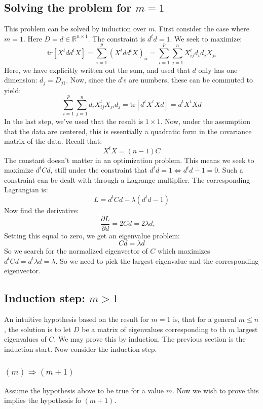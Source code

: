 \documentclass[12pt, a4paper]{article}
\numberwithin{equation}{section}
\begin{document}
\subsection{Solving the problem for $m=1$}
This problem can be solved by induction over $m$. First consider the case where $m=1$. Here $D=d\in\mathbb{R}^{n\times 1}$. The constraint is $d^t d=1$. We seek to maximize:
\begin{equation}
\textrm{tr}[X^t dd^t X]=\sum_{i=1}^p(X^t dd^t X)_{ii}=\sum_{i=1}^p\sum_{j=1}^n X^t_{ij}d_i d_j X_{ji}
\end{equation}
Here, we have explicitly written out the sum, and used that $d$ only has one dimension: $d_j=D_{j1}$. Now, since the $d$'s are numbers, these can be commuted to yield:
\begin{equation}
\sum_{i=1}^p\sum_{j=1}^n d_i X^t_{ij} X_{ji} d_j=\textrm{tr}[d^t X^t Xd]=d^t X^t Xd
\end{equation}
In the last step, we've used that the result is $1\times 1$. Now, under the assumption that the data are centered, this is essentially a quadratic form in the covariance matrix of the data. Recall that:
\begin{equation}
X^t X=(n-1)C
\end{equation}
The constant doesn't matter in an optimization problem. This means we seek to maximize $d^t Cd$, still under the constraint that $d^t d=1\Leftrightarrow d^t d-1=0$. Such a constraint can be dealt with through a Lagrange multiplier. The corresponding Lagrangian is:
\begin{equation}
L=d^t Cd-\lambda(d^t d-1)
\end{equation}
Now find the derivative:
\begin{equation}
\frac{\partial L}{\partial d}=2Cd=2\lambda d,\quad
\end{equation}
Setting this equal to zero, we get an eigenvalue problem:
\begin{equation}
Cd=\lambda d
\end{equation}
So we search for the normalized eigenvector of $C$ which maximizes $d^t Cd=d^t\lambda d=\lambda$. So we need to pick the largest eigenvalue and the corresponding eigenvector.

\subsection{Induction step: $m>1$}
An intuitive hypothesis based on the result for $m=1$ is, that for a general $m\le n$, the solution is to let $D$ be a matrix of eigenvalues corresponding to th $m$ largest eigenvalues of $C$. We may prove this by induction. The previous section is the induction start. Now consider the induction step.

\subsubsection{$(m)\Rightarrow(m+1)$}
Assume the hypothesis above to be true for a value $m$. Now we wish to prove this implies the hypothesis fo $(m+1)$.
\end{document}
